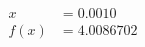 \documentclass[preview]{standalone}
\begin{document}
\begin{align*}
x &= 0.0010\\f(x) &= 4.0086702
\end{align*}
\end{document}
